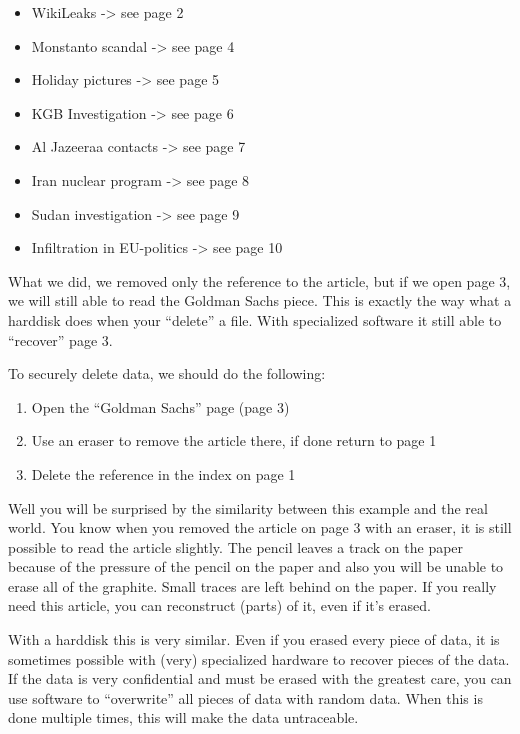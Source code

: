 \begin{itemize}
\item
  WikiLeaks -\textgreater{} see page 2
\item
  Monstanto scandal -\textgreater{} see page 4
\item
  Holiday pictures -\textgreater{} see page 5
\item
  KGB Investigation -\textgreater{} see page 6
\item
  Al Jazeeraa contacts -\textgreater{} see page 7
\item
  Iran nuclear program -\textgreater{} see page 8
\item
  Sudan investigation -\textgreater{} see page 9
\item
  Infiltration in EU-politics -\textgreater{} see page 10
\end{itemize}
What we did, we removed only the reference to the article, but if we
open page 3, we will still able to read the Goldman Sachs piece. This is
exactly the way what a harddisk does when your ``delete'' a file. With
specialized software it still able to ``recover'' page 3.

To securely delete data, we should do the following:

\begin{enumerate}[1.]
\item
  Open the ``Goldman Sachs'' page (page 3)
\item
  Use an eraser to remove the article there, if done return to page 1
\item
  Delete the reference in the index on page 1
\end{enumerate}
Well you will be surprised by the similarity between this example and
the real world. You know when you removed the article on page 3 with an
eraser, it is still possible to read the article slightly. The pencil
leaves a track on the paper because of the pressure of the pencil on the
paper and also you will be unable to erase all of the graphite. Small
traces are left behind on the paper. If you really need this article,
you can reconstruct (parts) of it, even if it's erased.

With a harddisk this is very similar. Even if you erased every piece of
data, it is sometimes possible with (very) specialized hardware to
recover pieces of the data. If the data is very confidential and must be
erased with the greatest care, you can use software to ``overwrite'' all
pieces of data with random data. When this is done multiple times, this
will make the data untraceable.

